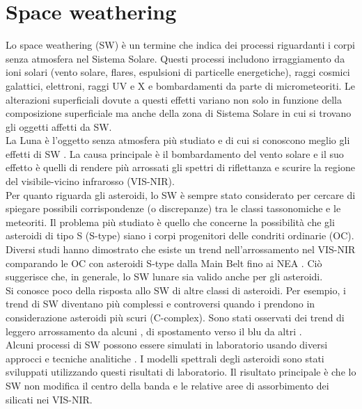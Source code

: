 \documentclass[a4paper,11pt,openright]{book}
\begin{document}
\section{Space weathering}
Lo space weathering (SW) è un termine che indica dei processi riguardanti i corpi senza atmosfera nel Sistema Solare. Questi processi includono irraggiamento da ioni solari (vento solare, flares, espulsioni di particelle energetiche), raggi cosmici galattici, elettroni, raggi UV e X e bombardamenti da parte di micrometeoriti. Le alterazioni superficiali dovute a questi effetti variano non solo in funzione della composizione superficiale ma anche della zona di Sistema Solare in cui si trovano gli oggetti affetti da SW.\\
La Luna è l'oggetto senza atmosfera più studiato e di cui si conoscono meglio gli effetti di SW \citep{gold_lunar_1955, hapke_space_2001}. 
La causa principale è il bombardamento del vento solare \citep{keller_nature_1997} e il suo effetto è quelli di rendere più arrossati gli spettri di riflettanza e scurire la regione del visibile-vicino infrarosso (VIS-NIR).\\
Per quanto riguarda gli asteroidi, lo SW è sempre stato considerato per cercare di spiegare possibili corrispondenze (o discrepanze) tra le classi tassonomiche e le meteoriti. Il problema più studiato è quello che concerne la possibilità che gli asteroidi di tipo S (S-type) siano i corpi progenitori delle condriti ordinarie (OC). %
Diversi studi hanno dimostrato che esiste un trend nell'arrossamento nel VIS-NIR comparando le OC con asteroidi S-type dalla Main Belt fino ai NEA \citep{binzel_observed_2004}. Ciò suggerisce che, in generale, lo SW lunare sia valido anche per gli asteroidi.\\
Si conosce poco della risposta allo SW di altre classi di asteroidi. Per esempio, i trend di SW diventano più complessi e controversi quando i prendono in considerazione asteroidi più scuri (C-complex). Sono stati osservati dei trend di leggero arrossamento da alcuni \citep{lazzarin_space_2006}, di spostamento verso il blu da altri \citep{vernazza_paucity_2013}.\\
Alcuni processi di SW possono essere simulati in laboratorio usando diversi approcci e tecniche analitiche \citep{bennett_space-weathering_2013}. I modelli spettrali degli asteroidi sono stati sviluppati utilizzando questi risultati di laboratorio. Il risultato principale è che lo SW non modifica il centro della banda e le relative aree di assorbimento dei silicati nei VIS-NIR. 
\end{document}
